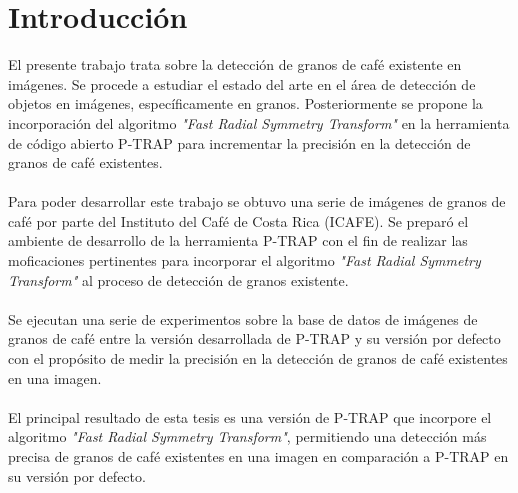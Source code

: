 \section{\textbf{Introducci\'on}}
El presente trabajo trata sobre la detecci\'on de granos de caf\'e existente en im\'agenes. 
Se procede a estudiar el estado del arte en el \'area de detecci\'on de objetos en im\'agenes, espec\'ificamente en granos. 
Posteriormente se propone la incorporaci\'on del algoritmo \textit{"Fast Radial Symmetry Transform"} en la herramienta de c\'odigo abierto P-TRAP para incrementar la precisi\'on en la detecci\'on de granos de caf\'e existentes. 
\\\\
Para poder desarrollar este trabajo se obtuvo una serie de im\'agenes de granos de caf\'e por parte del Instituto del Caf\'e de Costa Rica (ICAFE). Se prepar\'o el ambiente de desarrollo de la herramienta P-TRAP con el fin de realizar las moficaciones pertinentes para incorporar el algoritmo \textit{"Fast Radial Symmetry Transform"} al proceso de detecci\'on de granos existente.
\\\\
Se ejecutan una serie de experimentos sobre la base de datos de im\'agenes de granos de caf\'e entre la versi\'on desarrollada de P-TRAP y su versi\'on por defecto con el prop\'osito de medir la precisi\'on en la detecci\'on de granos de caf\'e existentes en una imagen.
\\\\
El principal resultado de esta tesis es una versi\'on de P-TRAP que incorpore el algoritmo \textit{"Fast Radial Symmetry Transform"}, permitiendo una detecci\'on m\'as precisa de granos de caf\'e existentes en una imagen en comparaci\'on a P-TRAP en su versi\'on por defecto. 




